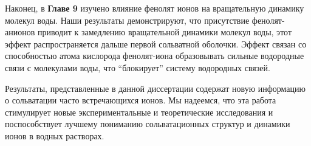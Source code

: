 Наконец, в \textbf{Главе 9} изучено влияние фенолят ионов на вращательную динамику молекул воды. Наши результаты демонстрируют, что присутствие фенолят-анионов приводит к замедлению вращательной динамики молекул воды, этот эффект распространяется дальше первой сольватной оболочки. Эффект связан со способностью атома кислорода фенолят-иона образовывать сильные водородные связи с молекулами воды, что “блокирует” систему водородных связей.

Результаты, представленные в данной диссертации содержат новую информацию о сольватации часто встречающихся ионов. Мы надеемся, что эта работа стимулирует новые экспериментальные и теоретические исследования и поспособствует лучшему пониманию сольватационных структур и динамики ионов в водных растворах. 






